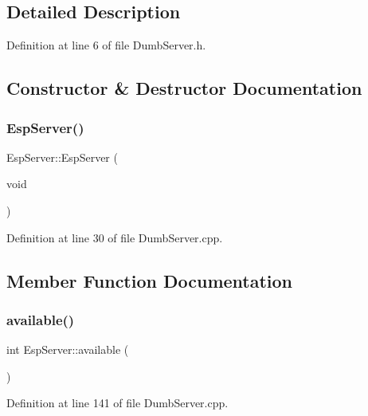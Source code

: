 \subsection{Detailed Description}


Definition at line 6 of file Dumb\+Server.\+h.



\subsection{Constructor \& Destructor Documentation}
\mbox{\label{class_esp_server_afcdc76f5ca68d5049657e5d9d971a1c3}} 
\subsubsection{\texorpdfstring{Esp\+Server()}{EspServer()}}
{\footnotesize\ttfamily Esp\+Server\+::\+Esp\+Server (\begin{DoxyParamCaption}\item[{void}]{ }\end{DoxyParamCaption})}



Definition at line 30 of file Dumb\+Server.\+cpp.



\subsection{Member Function Documentation}
\mbox{\label{class_esp_server_aad68b4972f6b8426004feeef6e98d02d}} 
\subsubsection{\texorpdfstring{available()}{available()}}
{\footnotesize\ttfamily int Esp\+Server\+::available (\begin{DoxyParamCaption}{ }\end{DoxyParamCaption})\hspace{0.3cm}{\ttfamily [virtual]}}



Definition at line 141 of file Dumb\+Server.\+cpp.

